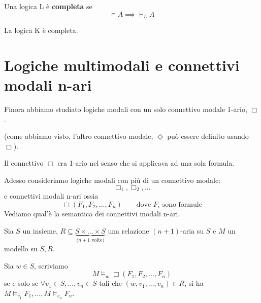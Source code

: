 \documentclass[../main.tex]{subfiles}
\begin{document}
\begin{definition}
    Una logica L è \textbf{completa} se
    \begin{equation*}
        \vDash A \implies \vdash_L A
    \end{equation*}
\end{definition}
\begin{theorem}
    La logica K è completa.
\end{theorem}

\section{Logiche multimodali e connettivi modali n-ari}
Finora abbiamo studiato logiche modali con un solo connettivo modale 1-ario, $\Box$.

(come abbiamo visto, l'altro connettivo modale, $\Diamond$ può essere definito usando $\Box$).

Il connettivo $\Box$ era 1-ario nel senso che si applicava ad una sola formula.

Adesso consideriamo logiche modali con più di un connettivo modale:
\begin{equation*}
    \Box_1, \Box_2, \ldots
\end{equation*}
e connettivi modali n-ari ossia
\begin{equation*}
    \Box (F_1, F_2, \ldots, F_n) \qquad \text{dove $F_i$ sono formule}
\end{equation*}
Vediamo qual'è la semantica dei connettivi modali n-ari.

Sia $S$ un insieme, $R \subseteq \underbrace{S \times \ldots \times S}_{\text{($n + 1$ volte)}}$ una relazione $(n + 1)$-aria su $S$ e $M$ un modello su $S,R$.

Sia $w \in S$, scriviamo
\begin{equation*}
    M \vDash_w \Box (F_1, F_2, \ldots, F_n)
\end{equation*}
se e solo se $\forall v_1 \in S, \ldots , v_n \in S$ tali che $(w,v_1,\ldots,v_n) \in R$, si ha $M \vDash_{v_1} F_1, \ldots , M \vDash_{v_n} F_n$.
\end{document}
